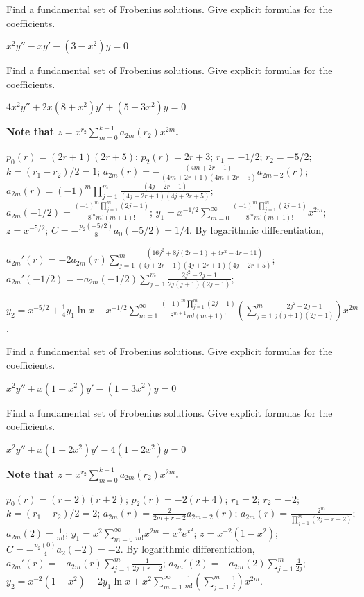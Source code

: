 \documentclass{ximera}
\begin{document}
\begin{problem}\label{exer:7.7.27}
Find
a fundamental set  of Frobenius solutions. Give explicit formulas for
the coefficients.

$x^2y''-xy'-(3-x^2)y=0$
\end{problem}

\begin{problem}\label{exer:7.7.28}
Find
a fundamental set  of Frobenius solutions. Give explicit formulas for
the coefficients.

$4x^2y''+2x(8+x^2)y'+(5+3x^2)y=0$

\begin{solution}
    \textbf{Note that $z=x^{r_2}\sum_{m=0}^{k-1}a_{2m}(r_2)x^{2m}$.}

    $p_0(r)=(2r+1)(2r+5)$;
$p_2(r)=2r+3$;
$r_1=-1/2$; $r_2=-5/2$; $k=(r_1-r_2)/2=1$;
$a_{2m}(r)=-\frac{(4m+2r-1)}{(4m+2r+1)(4m+2r+5)}a_{2m-2}(r)$;
$a_{2m}(r)=(-1)^m\prod_{j=1}^m\frac{(4j+2r-1)}{(4j+2r+1)(4j+2r+5)}$;
$a_{2m}(-1/2)=\frac{(-1)^m\prod_{j=1}^m(2j-1)}{8^mm!(m+1)!}$;
$y_1=x^{-1/2}\sum_{m=0}^\infty
\frac{(-1)^m\prod_{j=1}^m(2j-1)}{8^mm!(m+1)!}
x^{2m}$;
$z=x^{-5/2}$;
$C=-\frac{p_2(-5/2)}{8}a_0(-5/2)=1/4$.
By logarithmic differentiation,

$a_{2m}'(r)=-2a_{2m}(r)\sum_{j=1}^m
\frac{(16j^2+8j(2r-1)+4r^2-4r-11)}{(4j+2r-1)(4j+2r+1)(4j+2r+5)}$;
$a_{2m}'(-1/2)=-a_{2m}(-1/2)\sum_{j=1}^m\frac{2j^2-2j-1}{
2j(j+1)(2j-1)}$;

$y_2=x^{-5/2}+\frac{1}{4}y_1\ln x
-x^{-1/2}\sum_{m=1}^\infty\frac{(-1)^m\prod_{j=1}^m(2j-1)}{8^{m+1}m!(m+1)!}
\left(\sum_{j=1}^m\frac{2j^2-2j-1}{ j(j+1)(2j-1)}\right) x^{2m}$.
\end{solution}
\end{problem}

\begin{problem}\label{exer:7.7.29}
Find
a fundamental set  of Frobenius solutions. Give explicit formulas for
the coefficients.

$x^2y''+x(1+x^2)y'-(1-3x^2)y=0$
\end{problem}

\begin{problem}\label{exer:7.7.30}
Find
a fundamental set  of Frobenius solutions. Give explicit formulas for
the coefficients.

$x^2y''+x(1-2x^2)y'-4(1+2x^2)y=0$

\begin{solution}
    \textbf{Note that $z=x^{r_2}\sum_{m=0}^{k-1}a_{2m}(r_2)x^{2m}$.}

    $p_0(r)=(r-2)(r+2)$;
$p_2(r)=-2(r+4)$;
$r_1=2$; $r_2=-2$; $k=(r_1-r_2)/2=2$;
$a_{2m}(r)=\frac{2}{2m+r-2}a_{2m-2}(r)$;
 $a_{2m}(r)=\frac{2^m}{\prod_{j=1}^m(2j+r-2)}$;
$a_{2m}(2)=\frac{1}{ m!}$;
$y_1=x^2\sum_{m=0}^\infty\frac{1}{ m!}x^{2m}=x^2e^{x^2}$;
$z=x^{-2}(1-x^2)$;
$C=-\frac{p_2(0)}{4}a_2(-2)=-2$.
By logarithmic differentiation,
$a_{2m}'(r)=-a_{2m}(r)\sum_{j=1}^m\frac{1}{2j+r-2} $;
$a_{2m}'(2)=-a_{2m}(2)\sum_{j=1}^m\frac{1}{2j}$;
$y_2=x^{-2}(1-x^2)-2y_1\ln x+x^2\sum_{m=1}^\infty\frac{1}{
m!}\left(\sum_{j=1}^m\frac{1}{ j}\right)x^{2m}$.
\end{solution}
\end{problem}
\end{document}
